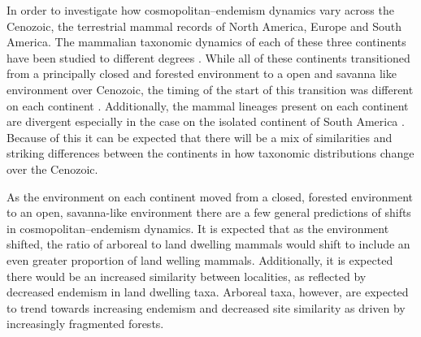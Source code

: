\documentclass[12pt,letterpaper]{article}
\begin{document}
In order to investigate how cosmopolitan--endemism dynamics vary across the Cenozoic, the terrestrial mammal records of North America, Europe and South America. The mammalian taxonomic dynamics of each of these three continents have been studied to different degrees \citep{Jernvall2002,Jernvall2004,Flynn1998a,Macfadden2006,Macfadden1997,Alroy1996a,Blois2009,Eronen2009,Gunnell1995,Raia2006}. While all of these continents transitioned from a principally closed and forested environment to a open and savanna like environment over Cenozoic, the timing of the start of this transition was different on each continent \citep{Blois2009,Eronen2009,Janis1993b}. Additionally, the mammal lineages present on each continent are divergent especially in the case on the isolated continent of South America \citep{Flynn1998a,Macfadden2006,Macfadden1997}. Because of this it can be expected that there will be a mix of similarities and striking differences between the continents in how taxonomic distributions change over the Cenozoic.


As the environment on each continent moved from a closed, forested environment to an open, savanna-like environment there are a few general predictions of shifts in cosmopolitan--endemism dynamics. It is expected that as the environment shifted, the ratio of arboreal to land dwelling mammals would shift to include an even greater proportion of land welling mammals. Additionally, it is expected there would be an increased similarity between localities, as reflected by decreased endemism in land dwelling taxa. Arboreal taxa, however, are expected to trend towards increasing endemism and decreased site similarity as driven by increasingly fragmented forests.
\end{document}
